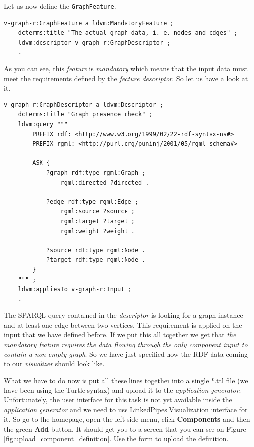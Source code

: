Let us now define the \texttt{GraphFeature}.

\scriptsize
\begin{verbatim}
v-graph-r:GraphFeature a ldvm:MandatoryFeature ;
    dcterms:title "The actual graph data, i. e. nodes and edges" ;
    ldvm:descriptor v-graph-r:GraphDescriptor ;
    .
\end{verbatim}
\normalsize

As you can see, this \emph{feature} is \emph{mandatory} which means that the input data must meet the requirements defined by the \emph{feature descriptor}. So let us have a look at it.

\scriptsize
\begin{verbatim}
v-graph-r:GraphDescriptor a ldvm:Descriptor ;
    dcterms:title "Graph presence check" ;
    ldvm:query """
        PREFIX rdf: <http://www.w3.org/1999/02/22-rdf-syntax-ns#>
        PREFIX rgml: <http://purl.org/puninj/2001/05/rgml-schema#>

        ASK {
            ?graph rdf:type rgml:Graph ;
                rgml:directed ?directed .

            ?edge rdf:type rgml:Edge ;
                rgml:source ?source ;
                rgml:target ?target ;
                rgml:weight ?weight .

            ?source rdf:type rgml:Node .
            ?target rdf:type rgml:Node .
        }
    """ ;
    ldvm:appliesTo v-graph-r:Input ;
    .
\end{verbatim}
\normalsize

The SPARQL query contained in the \emph{descriptor} is looking for a graph instance and at least one edge between two vertices. This requirement is applied on the input that we have defined before. If we put this all together we get that \textit{the \emph{mandatory feature} requires the data flowing through the only \emph{component input} to contain a non-empty graph}. So we have just specified how the RDF data coming to our \emph{visualizer} should look like.

What we have to do now is put all these lines together into a single *.ttl file (we have been using the Turtle syntax) and upload it to the \emph{application generator}. Unfortunately, the user interface for this task is not yet available inside the \emph{application generator} and we need to use LinkedPipes Visualization interface for it. So go to the homepage, open the left side menu, click \textbf{Components} and then the green \textbf{Add} button. It should get you to a screen that you can see on Figure \ref{fig:upload_component_definition}. Use the form to upload the definition.

